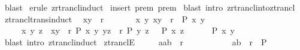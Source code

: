 \begin{isabellebody}
\isanewline
{}\isamarkupfalse%
\ blast\isanewline
{}\isamarkupfalse%
\ {\isacharparenleft}erule\ zrtrancl{\isacharunderscore}induct{\isacharparenright}\isanewline
{}\isamarkupfalse%
\ {\isacharparenleft}insert\ prem{}\ prem{}{\isacharparenright}\isanewline
{}\isamarkupfalse%
\ {\isacharparenleft}blast\ intro{\isacharcolon}\ zrtrancl{\isacharunderscore}into{\isacharunderscore}ztrancl{}{\isacharparenright}{\isacharplus}\isanewline
{}\isamarkupfalse%
%
\endisatagproof
{\isafoldproof}%
%
\isadelimproof
\isanewline
%
\endisadelimproof
\isanewline
\isanewline
{}\isamarkupfalse%
\ ztrancl{\isacharunderscore}trans{\isacharunderscore}induct{\isacharcolon}\isanewline
\ {\isachardoublequoteopen}{\isacharbrackleft}{\isacharbar}\ {\isacharparenleft}x{\isacharcomma}y{\isacharparenright}\ {\isacharcolon}\ r{\isacharpercent}{\isacharplus}{\isacharsemicolon}\ \ \isanewline
\ \ \ \ \ {\isacharbang}{\isacharbang}x\ y{\isachardot}\ {\isacharparenleft}x{\isacharcomma}y{\isacharparenright}\ {\isacharcolon}\ r\ {\isacharequal}{\isacharequal}{\isachargreater}\ P\ x\ y{\isacharsemicolon}\ \ \isanewline
\ \ \ \ \ {\isacharbang}{\isacharbang}x\ y\ z{\isachardot}\ {\isacharbrackleft}{\isacharbar}\ {\isacharparenleft}x{\isacharcomma}y{\isacharparenright}\ {\isacharcolon}\ r{\isacharpercent}{\isacharplus}{\isacharsemicolon}\ P\ x\ y{\isacharsemicolon}\ {\isacharparenleft}y{\isacharcomma}z{\isacharparenright}\ {\isacharcolon}\ r{\isacharpercent}{\isacharplus}{\isacharsemicolon}\ P\ y\ z\ {\isacharbar}{\isacharbrackright}\ {\isacharequal}{\isacharequal}{\isachargreater}\ P\ x\ z\ \ \isanewline
\ \ {\isacharbar}{\isacharbrackright}\ {\isacharequal}{\isacharequal}{\isachargreater}\ P\ x\ y{\isachardoublequoteclose}\isanewline
%
\isadelimproof
%
\endisadelimproof
%
\isatagproof
{}\isamarkupfalse%
\ {\isacharparenleft}blast\ intro{\isacharcolon}\ ztrancl{\isacharunderscore}induct{\isacharparenright}\isanewline
{}\isamarkupfalse%
%
\endisatagproof
{\isafoldproof}%
%
\isadelimproof
\isanewline
%
\endisadelimproof
\isanewline
\isanewline
\isanewline
{}\isamarkupfalse%
\ ztranclE{\isacharcolon}\isanewline
\ \ \ \ {\isachardoublequoteopen}{\isacharbrackleft}{\isacharbar}\ {\isacharparenleft}a{\isacharcolon}{\isacharcolon}{\isacharprime}a{\isacharcomma}b{\isacharparenright}\ {\isacharcolon}\ r{\isacharpercent}{\isacharplus}{\isacharsemicolon}\ \ \ \isanewline
\ \ \ \ \ \ \ \ {\isacharparenleft}a{\isacharcomma}b{\isacharparenright}\ {\isacharcolon}\ r\ {\isacharequal}{\isacharequal}{\isachargreater}\ P{\isacharsemicolon}\ \ \isanewline

\end{isabellebody}
